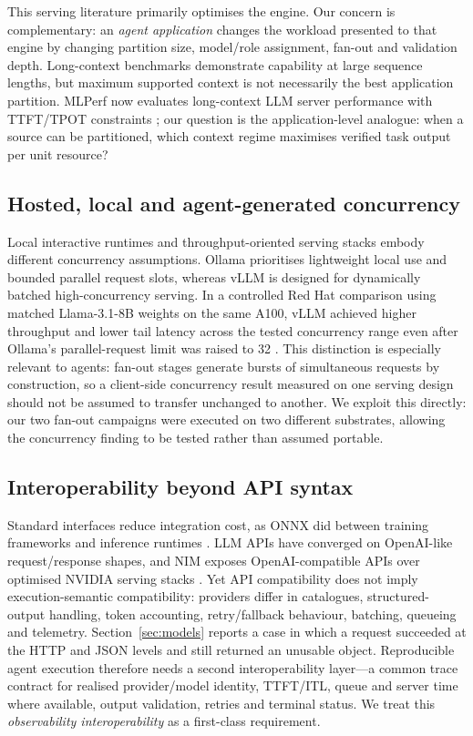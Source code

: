 \documentclass[conference]{IEEEtran}
\begin{document}
This serving literature primarily optimises the engine. Our concern is complementary: an \emph{agent application} changes the workload presented to that engine by changing partition size, model/role assignment, fan-out and validation depth. Long-context benchmarks demonstrate capability at large sequence lengths, but maximum supported context is not necessarily the best application partition. MLPerf now evaluates long-context LLM server performance with TTFT/TPOT constraints \cite{mlperf2025llm}; our question is the application-level analogue: when a source can be partitioned, which context regime maximises verified task output per unit resource?

\subsection{Hosted, local and agent-generated concurrency}
Local interactive runtimes and throughput-oriented serving stacks embody different concurrency assumptions. Ollama prioritises lightweight local use and bounded parallel request slots, whereas vLLM is designed for dynamically batched high-concurrency serving. In a controlled Red Hat comparison using matched Llama-3.1-8B weights on the same A100, vLLM achieved higher throughput and lower tail latency across the tested concurrency range even after Ollama's parallel-request limit was raised to 32 \cite{redhat2025ollamavllm}. This distinction is especially relevant to agents: fan-out stages generate bursts of simultaneous requests by construction, so a client-side concurrency result measured on one serving design should not be assumed to transfer unchanged to another. We exploit this directly: our two fan-out campaigns were executed on two different substrates, allowing the concurrency finding to be tested rather than assumed portable.

\subsection{Interoperability beyond API syntax}
Standard interfaces reduce integration cost, as ONNX did between training frameworks and inference runtimes \cite{onnx2019}. LLM APIs have converged on OpenAI-like request/response shapes, and NIM exposes OpenAI-compatible APIs over optimised NVIDIA serving stacks \cite{nvidiaNIM}. Yet API compatibility does not imply execution-semantic compatibility: providers differ in catalogues, structured-output handling, token accounting, retry/fallback behaviour, batching, queueing and telemetry. Section~\ref{sec:models} reports a case in which a request succeeded at the HTTP and JSON levels and still returned an unusable object. Reproducible agent execution therefore needs a second interoperability layer---a common trace contract for realised provider/model identity, TTFT/ITL, queue and server time where available, output validation, retries and terminal status. We treat this \emph{observability interoperability} as a first-class requirement.
\end{document}
